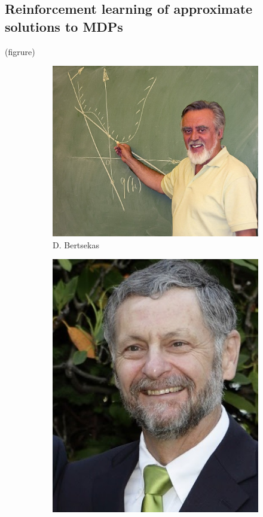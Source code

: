 \subsection{Reinforcement learning of approximate solutions to MDPs}
(figrure)
\begin{figure}
    \centering
    \begin{subfigure}[b]{0.22\textwidth}
        \centering
        \includegraphics[width=\textwidth]{images/images_intro/Dimitri_Wiki_Pict.jpg}
        \caption{D. Bertsekas}
    \end{subfigure}
    \hfill
    \begin{subfigure}[b]{0.22\textwidth}
        \centering
        \includegraphics[width=\textwidth]{images/images_intro/puterman.jpg}

\end{subfigure}
\end{figure}
